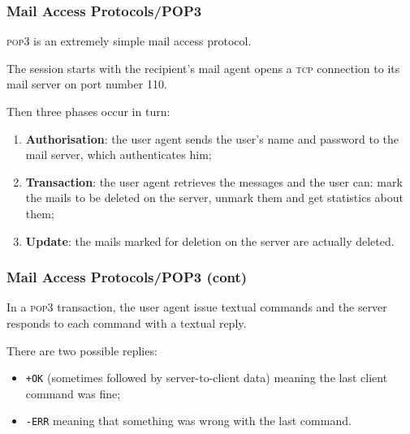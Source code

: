 %
\begin{frame}
\frametitle{Mail Access Protocols/POP3}

\textsc{pop3} is an extremely simple mail access protocol. 

The session starts with the recipient's mail agent opens a
\textsc{tcp} connection to its mail server on port number 110.

Then three phases occur in turn:
\begin{enumerate}

  \item \textbf{Authorisation}: the user agent sends the user's name
  and password to the mail server, which authenticates him;

  \item \textbf{Transaction}: the user agent retrieves the messages
  and the user can: mark the mails to be deleted on the server,
  unmark them and get statistics about them;

  \item \textbf{Update}: the mails marked for deletion on the server
  are actually deleted.

\end{enumerate}

\end{frame}

%
\begin{frame}
\frametitle{Mail Access Protocols/POP3
  (cont)}

In a \textsc{pop3} transaction, the user agent issue textual commands
and the server responds to each command with a textual reply.

There are two possible replies:
\begin{itemize}

  \item \texttt{+OK} (sometimes followed by server-to-client data)
  meaning the last client command was fine;

  \item \texttt{-ERR} meaning that something was wrong with the last
  command.

\end{itemize}

\end{frame}

